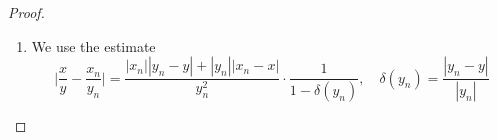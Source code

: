 \begin{proof}
\begin{enumerate}
      \begin{equation}
        |y_n| < Y \text{ for all } n \in \mathbb{N}
      \end{equation}
      Then, we see that
      \begin{align}
        |x_n y_n - xy| & = |(x_n y_n - xy_n) + (xy_n - xy)| \\
        & < |x_n y_n - x y_n| + |x y_n - xy| \\
        & = |y_n| |x_n - x| + |x| |y_n - y|
      \end{align}
      Suppose $\epsilon > 0$ is given. Then, we can set the error bounds freely; there exists $N_1, N_2 \in \mathbb{N}$ such that 
      \begin{align}
        |x_n - x| < \frac{\epsilon}{2Y} \text{ for all } n > N_1 \\
        |y_n - y| < \frac{\epsilon}{2|x|} \text{ for all } n > N_2
      \end{align}
      Then, we can see that 
      \begin{equation}
        |x_n y_n - xy| \leq |y_n||x_n -x| + |x| |y_n - y| < Y \cdot \frac{\epsilon}{2Y} + |x| \frac{\epsilon}{2|x|} = \epsilon
      \end{equation}
      for all $n> N = \max\{N_1, N_2\}$.

      \item We use the estimate
      \begin{equation}
        \bigg| \frac{x}{y} - \frac{x_n}{y_n} \bigg| = \frac{|x_n| |y_n - y| + |y_n||x_n - x|}{y_n^2} \cdot \frac{1}{1 - \delta(y_n)}, \quad \delta(y_n) = \frac{|y_n - y|}{|y_n|}
      \end{equation}


\end{enumerate}
\end{proof}
